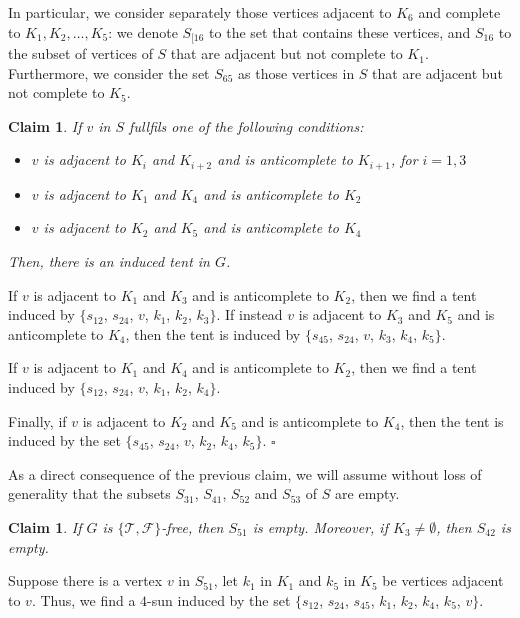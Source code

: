 \documentclass[12pt]{book}
\theoremstyle{plain}
\newtheorem{claim}[teo]{Claim}
\theoremstyle{remark}
\newcommand*{\QED}{\hfill\ensuremath{\square}}%
\begin{document}
 In particular, we consider separately those vertices adjacent to $K_6$ and complete to $K_1, K_2, \ldots, K_5$: we denote $S_{[16}$ to the set that contains these vertices, and $S_{16}$ to the subset of vertices of $S$ that are adjacent but not complete to $K_1$. Furthermore, we consider the set $S_{65}$ as those vertices in $S$ that are adjacent but not complete to $K_5$.  

\begin{claim} \label{claim:4tent_0}
	If $v$ in $S$ fullfils one of the following conditions:
	\begin{itemize}
		\item $v$ is adjacent to $K_i$ and $K_{i+2}$ and is anticomplete to $K_{i+1}$, for $i=1,3$
		\item $v$ is adjacent to $K_1$ and $K_4$ and is anticomplete to $K_2$
		\item $v$ is adjacent to $K_2$ and $K_5$ and is anticomplete to $K_4$  
	\end{itemize}
	Then, there is an induced tent in $G$.
\end{claim} 

If $v$ is adjacent to $K_1$ and $K_3$ and is anticomplete to $K_2$, then we find a tent induced by $\{s_{12}$, $s_{24}$, $v$, $k_1$, $k_2$, $k_3\}$. If instead $v$ is adjacent to $K_3$ and $K_5$ and is anticomplete to $K_4$, then the tent is induced by $\{s_{45}$, $s_{24}$, $v$, $k_3$, $k_4$, $k_5\}$.

If $v$ is adjacent to $K_1$ and $K_4$ and is anticomplete to $K_2$, then we find a tent induced by $\{s_{12}$, $s_{24}$, $v$, $k_1$, $k_2$, $k_4\}$.

Finally, if $v$ is adjacent to $K_2$ and $K_5$ and is anticomplete to $K_4$, then the tent is induced by the set $\{s_{45}$, $s_{24}$, $v$, $k_2$, $k_4$, $k_5\}$. \QED

\vspace{1mm}
As a direct consequence of the previous claim, we will assume without loss of gen\-er\-al\-i\-ty that the subsets $S_{31}$, $S_{41}$, $S_{52}$ and $S_{53}$ of $S$ are empty.


\begin{claim} \label{claim:4tent_1}
	If $G$ is $\{ \mathcal{T}, \mathcal{F} \}$-free, then $S_{51}$ is empty. Moreover, if $K_3 \neq \emptyset$, then $S_{42}$ is empty.
\end{claim} 

Suppose there is a vertex $v$ in $S_{51}$, let $k_1$ in $K_1$ and $k_5$ in $K_5$ be vertices adjacent to $v$. Thus, we find a $4$-sun induced by the set $\{ s_{12}$, $s_{24}$, $s_{45}$, $k_1$, $k_2$, $k_4$, $k_5$, $v \}$.
\end{document}
